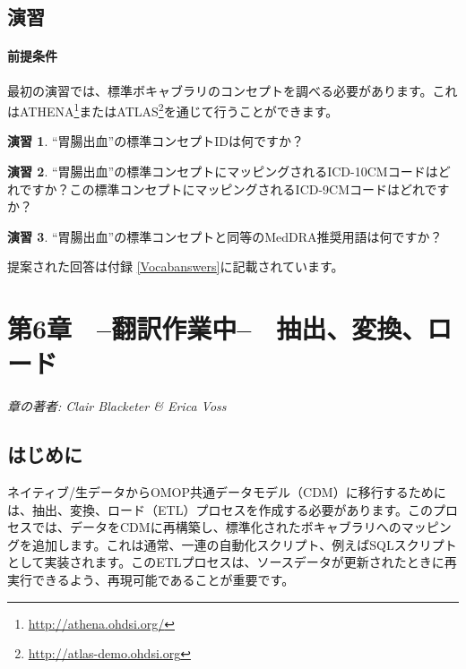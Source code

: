 \documentclass[
  11pt]{book}
\theoremstyle{definition}
\theoremstyle{definition}
\theoremstyle{definition}
\newtheorem{exercise}{演習}[chapter]
\theoremstyle{definition}
\theoremstyle{remark}
\begin{document}
\section{演習}\label{ux6f14ux7fd2}

\subsubsection*{前提条件}\label{ux524dux63d0ux6761ux4ef6-2}

最初の演習では、標準ボキャブラリのコンセプトを調べる必要があります。これはATHENA\footnote{\url{http://athena.ohdsi.org/}}またはATLAS\footnote{\url{http://atlas-demo.ohdsi.org}}を通じて行うことができます。

\begin{exercise}
\protect\hypertarget{exr:exerciseVocab1}{}\label{exr:exerciseVocab1}``胃腸出血''の標準コンセプトIDは何ですか？
\end{exercise}

\begin{exercise}
\protect\hypertarget{exr:exerciseVocab2}{}\label{exr:exerciseVocab2}``胃腸出血''の標準コンセプトにマッピングされるICD-10CMコードはどれですか？この標準コンセプトにマッピングされるICD-9CMコードはどれですか？
\end{exercise}

\begin{exercise}
\protect\hypertarget{exr:exerciseVocab3}{}\label{exr:exerciseVocab3}``胃腸出血''の標準コンセプトと同等のMedDRA推奨用語は何ですか？
\end{exercise}

提案された回答は付録 \ref{Vocabanswers}に記載されています。

\chapter{第6章　--翻訳作業中--　抽出、変換、ロード}\label{ExtractTransformLoad}

\emph{章の著者: Clair Blacketer \& Erica Voss}

\section{はじめに}\label{ux306fux3058ux3081ux306b}

ネイティブ/生データからOMOP共通データモデル（CDM）に移行するためには、抽出、変換、ロード（ETL）プロセスを作成する必要があります。このプロセスでは、データをCDMに再構築し、標準化されたボキャブラリへのマッピングを追加します。これは通常、一連の自動化スクリプト、例えばSQLスクリプトとして実装されます。このETLプロセスは、ソースデータが更新されたときに再実行できるよう、再現可能であることが重要です。   
\end{document}
